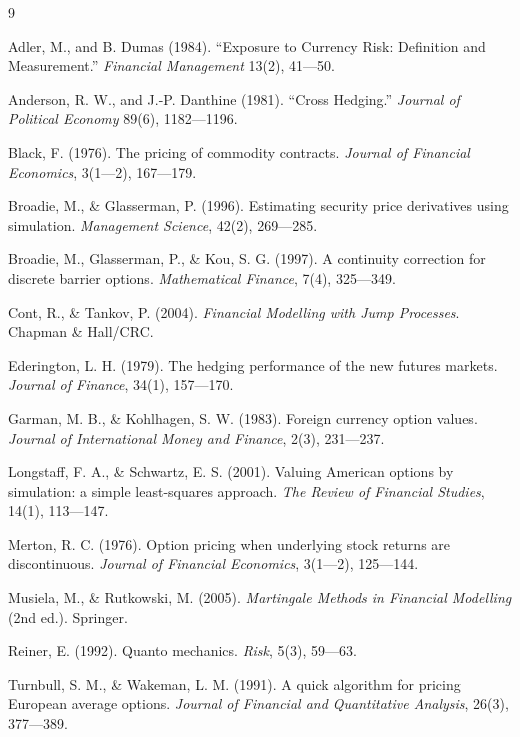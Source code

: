 \documentclass[11pt,a4paper]{article}
\begin{document}
\begin{thebibliography}{9}

Adler, M., and B. Dumas (1984). ``Exposure to Currency Risk: Definition and Measurement.'' \emph{Financial Management} 13(2), 41---50.

Anderson, R. W., and J.-P. Danthine (1981). ``Cross Hedging.'' \emph{Journal of Political Economy} 89(6), 1182---1196.

Black, F. (1976). The pricing of commodity contracts. \textit{Journal of Financial Economics}, 3(1---2), 167---179.

Broadie, M., \& Glasserman, P. (1996). Estimating security price derivatives using simulation. \textit{Management Science}, 42(2), 269---285.

Broadie, M., Glasserman, P., \& Kou, S. G. (1997). A continuity correction for discrete barrier options. \textit{Mathematical Finance}, 7(4), 325---349.

Cont, R., \& Tankov, P. (2004). \textit{Financial Modelling with Jump Processes}. Chapman \& Hall/CRC.

Ederington, L. H. (1979). The hedging performance of the new futures markets. \textit{Journal of Finance}, 34(1), 157---170.

Garman, M. B., \& Kohlhagen, S. W. (1983). Foreign currency option values. \textit{Journal of International Money and Finance}, 2(3), 231---237.

Longstaff, F. A., \& Schwartz, E. S. (2001). Valuing American options by simulation: a simple least-squares approach. \textit{The Review of Financial Studies}, 14(1), 113---147.

Merton, R. C. (1976). Option pricing when underlying stock returns are discontinuous. \textit{Journal of Financial Economics}, 3(1---2), 125---144.

Musiela, M., \& Rutkowski, M. (2005). \textit{Martingale Methods in Financial Modelling} (2nd ed.). Springer.


Reiner, E. (1992). Quanto mechanics. \textit{Risk}, 5(3), 59---63.

Turnbull, S. M., \& Wakeman, L. M. (1991). A quick algorithm for pricing European average options. \textit{Journal of Financial and Quantitative Analysis}, 26(3), 377---389.

\end{thebibliography}
\end{document}
